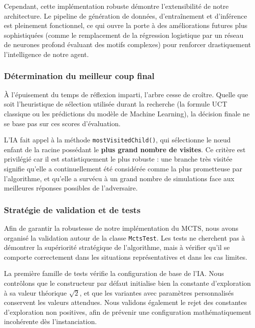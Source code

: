 \documentclass[a4paper]{article}
\begin{document}
Cependant, cette implémentation robuste démontre l'extensibilité de notre architecture. Le pipeline de génération de données, 
d'entraînement et d'inférence est pleinement fonctionnel, ce qui ouvre la porte à des améliorations futures plus sophistiquées 
(comme le remplacement de la régression logistique par un réseau de neurones profond évaluant des motifs complexes) pour renforcer drastiquement 
l'intelligence de notre agent.

\subsubsection{Détermination du meilleur coup final}

À l'épuisement du temps de réflexion imparti, l'arbre cesse de croître. Quelle que soit l'heuristique de sélection utilisée durant la recherche 
(la formule UCT classique ou les prédictions du modèle de Machine Learning), la décision finale ne se base pas sur ces scores d'évaluation. 

L'IA fait appel à la méthode \texttt{mostVisitedChild()}, qui sélectionne le nœud enfant de la racine possédant le 
\textbf{plus grand nombre de visites}. Ce critère est privilégié car il est statistiquement le plus robuste : une branche très visitée 
signifie qu'elle a continuellement été considérée comme la plus prometteuse par l'algorithme, et qu'elle a survécu à un grand nombre de
 simulations face aux meilleures réponses possibles de l'adversaire.

\subsubsection{Stratégie de validation et de tests}

Afin de garantir la robustesse de notre implémentation du MCTS, nous avons organisé la validation autour de la classe
\texttt{MctsTest}. Les tests ne cherchent pas à démontrer la supériorité stratégique de l'algorithme, mais à vérifier qu'il se
comporte correctement dans les situations représentatives et dans les cas limites.

La première famille de tests vérifie la configuration de base de l'IA. Nous contrôlons que le constructeur par défaut initialise
bien la constante d'exploration à sa valeur théorique \(\sqrt{2}\), et que les variantes avec paramètres personnalisés
conservent les valeurs attendues. Nous validons également le rejet des constantes d'exploration non positives, afin de prévenir
une configuration mathématiquement incohérente dès l'instanciation. \\
\end{document}
